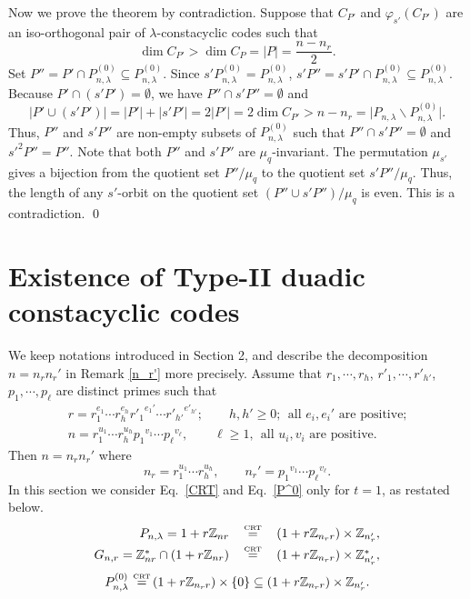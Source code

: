 \documentclass{article}
\numberwithin{equation}{section}
\numberwithin{table}{section}
\def\Z{{\Bbb Z}}
\def\M{{\varphi}} \def\N{{\psi}} \def\m{{\mu}}
\def\CRT{\,\mathop{=}\limits^{\mbox{\rm\tiny CRT}}\,}
\begin{document}
Now we prove the theorem by contradiction. Suppose that
$C_{P'}$ and $\M_{s'}(C_{P'})$ are an iso-orthogonal pair
of $\lambda$-constacyclic codes such that
$$\dim C_{P'}>\dim C_P=|P|=\frac{n-n_r}{2}.$$
Set $P''=P'\cap P_{n,\lambda}^{(0)}\subseteq P_{n,\lambda}^{(0)}$.
Since $s'P_{n,\lambda}^{(0)}=P_{n,\lambda}^{(0)}$,
$s'P''=s'P'\cap P_{n,\lambda}^{(0)}\subseteq P_{n,\lambda}^{(0)}$.
Because $P'\cap(s'P')=\emptyset$, we have $P''\cap s'P''=\emptyset$ and
$$
  |P'\cup(s'P')|=|P'|+|s'P'|=2|P'|=2\dim C_{P'}
   >n-n_r=\big|P_{n,\lambda}\backslash P_{n,\lambda}^{(0)}\big|.
$$
Thus, $P''$ and $s'P''$ are non-empty subsets 
of $P_{n,\lambda}^{(0)}$ 
such that $P''\cap s'P''=\emptyset$ and $s'^2P''=P''$.
Note that both $P''$ and $s'P''$ are $\mu_q$-invariant.
The permutation $\mu_{s'}$ gives a bijection from the quotient set
$P''/\mu_q$ to the quotient set $s'P''/\mu_q$.
Thus, the length of any $s'$-orbit on the quotient set
$(P''\cup s'P'')/\mu_q$ is even. This is a contradiction.
\qed


\section{Existence of Type-II duadic constacyclic codes}

We keep notations introduced in Section 2,
and describe the decomposition $n=n_rn_r'$ in Remark \ref{n_r'} more precisely.
Assume that $r_1,\cdots,r_h$, $r'_1,\cdots,r'_{h'}$, $p_1,\cdots,p_\ell$
are distinct primes such that
\begin{equation}\label{n,r}
\begin{array}{l}
 r=r_1^{e_1}\cdots r_h^{e_h}{r'_1}^{e_1'}\cdots{r'_{h'}}^{e'_{h'}};\qquad
 h,h'\ge 0;~~\mbox{all $e_i,e_i'$ are positive;}\\[6pt]
n=r_1^{u_1}\cdots r_h^{u_h}{p_1}^{v_1}\cdots{p_{\ell}}^{v_{\ell}},\qquad
 \ell\ge 1,~~\mbox{all $u_i,v_i$ are positive.}
\end{array}
\end{equation}
Then $n=n_rn_r'$ where
\begin{equation}\label{n_r}
  n_r=r_1^{u_1}\cdots r_h^{u_h},\qquad
  n_r'={p_1}^{v_1}\cdots {p_{\ell}}^{v_{\ell}}.
\end{equation}
In this section we consider Eq.~\eqref{CRT} and Eq.~\eqref{P^0} only for $t=1$,
as restated below.
\begin{equation}\label{CRT'}
\begin{array}{rcl}
P_{n,\lambda}=1+r\Z_{nr}&\CRT & (1+r\Z_{n_r r})\times\Z_{n_r'},\\[3pt]
G_{n,r}=\Z_{nr}^*\cap(1+r\Z_{nr})
  &\CRT& (1+r\Z_{n_r r})\times \Z_{n_r'}^*,
\end{array}
\end{equation}
\begin{equation}\label{P^0'}
 P_{n,\lambda}^{(0)}\CRT (1+r\Z_{n_r r})\times \{0\}\subseteq (1+r\Z_{n_r r})\times \Z_{n_r'}.
\end{equation}
\end{document}
